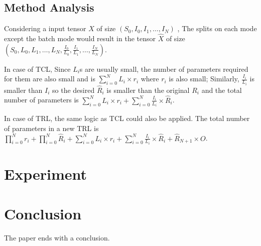 \documentclass[runningheads]{llncs}
\begin{document}
\subsection{Method Analysis}
\label{subsec:method-analysis}
Considering a input tensor $X$ of size
$(S_0,I_0,I_1,\dots,I_N)$
, The splits on each mode except the batch mode would result in the tensor $\hat{X}$ of size
\linebreak
$(S_0, L_0,L_1,\dots,L_N, \frac{I_0}{L_0}, \frac{I_1}{L_1}, \dots, \frac{I_N}{L_N})$.

In case of TCL, Since $L_i$s are usually small, the number of parameters required for them are also small and is $\sum_{i=0}^{N}L_i\times r_i$ where $r_i$ is also small; Similarly, $\frac{I_i}{L_i}$ is smaller than $I_i$ so the desired $\hat{R}_i$ is smaller than the original $R_i$ and the total number of parameters is 
$\sum_{i=0}^{N}L_i\times r_i + \sum_{i=0}^{N}\frac{I_i}{L_i} \times \hat{R}_i$.

In case of TRL, the same logic as TCL could also be applied. The total number of parameters in a new TRL is 
$\prod_{i=0}^{N}r_i + \prod_{i=0}^{N}\hat{R}_i + \sum_{i=0}^{N}L_i\times r_i + \sum_{i=0}^{N}\frac{I_i}{L_i}\times \hat{R}_i + \hat{R}_{N+1}\times O$. 


\section{Experiment}
\label{sec:experiment}


\section{Conclusion}
The paper ends with a conclusion. 



%
%


\end{document}
